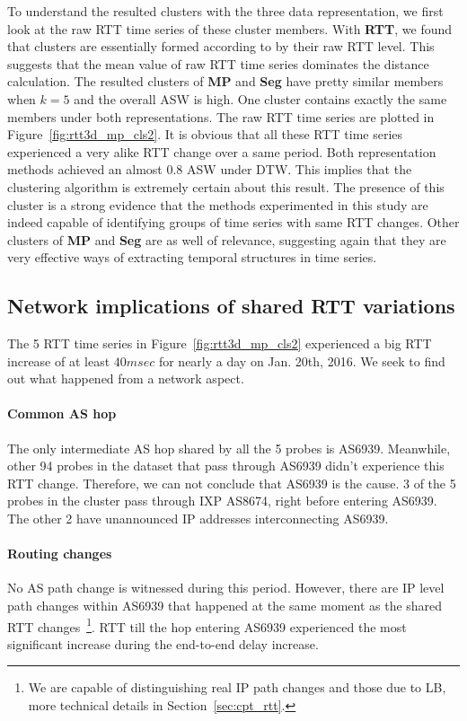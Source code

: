 To understand the resulted clusters with the three data representation, we first look at the raw RTT time series of these cluster members.
With \textbf{RTT}, we found that clusters are essentially formed according to by their raw RTT level.
This suggests that the mean value of raw RTT time series dominates the distance calculation. 
The resulted clusters of \textbf{MP} and \textbf{Seg} have pretty similar members when $k=5$ and the overall \ac{ASW} is high. One cluster contains exactly the same members under both representations.
The raw RTT time series are plotted in Figure~\ref{fig:rtt3d_mp_cls2}.
It is obvious that all these RTT time series experienced a very alike RTT change over a same period.
Both representation methods achieved an almost 0.8 \ac{ASW} under \ac{DTW}.
This implies that the clustering algorithm is extremely certain about this result.
The presence of this cluster is a strong evidence that the methods experimented in this study are indeed capable of identifying groups of time series with same RTT changes.
Other clusters of \textbf{MP} and \textbf{Seg} are as well of relevance, suggesting again that they are very effective ways of extracting temporal structures in time series.

\subsection{Network implications of shared RTT variations}

The 5 RTT time series in Figure~\ref{fig:rtt3d_mp_cls2} experienced a big RTT increase of at least $40msec$ for nearly a day on Jan. 20th, 2016.
We seek to find out what happened from a network aspect.

\paragraph*{Common AS hop} The only intermediate AS hop shared by all the 5 probes is AS6939.
Meanwhile, other 94 probes in the dataset that pass through AS6939 didn't experience this RTT change.
Therefore, we can not conclude that AS6939 is the cause.
3 of the 5 probes in the cluster pass through IXP AS8674, right before entering AS6939.
The other 2 have unannounced IP addresses interconnecting AS6939.

\paragraph*{Routing changes} No AS path change is witnessed during this period.
However, there are IP level path changes within AS6939 that happened at the same moment as the shared RTT changes~\footnote{We are capable of distinguishing real IP path changes and those due to \ac{LB}, more technical details in Section~\ref{sec:cpt_rtt}.}.
RTT till the hop entering AS6939 experienced the most significant increase during the end-to-end delay increase.

